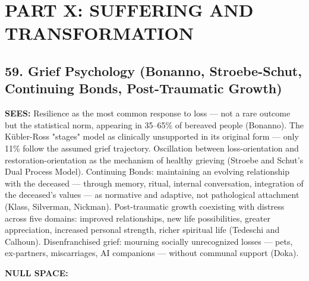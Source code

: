 \section*{PART X: SUFFERING AND TRANSFORMATION}


\subsection*{59. Grief Psychology (Bonanno, Stroebe-Schut, Continuing Bonds, Post-Traumatic Growth)}


\textbf{SEES:} Resilience as the most common response to loss — not a rare outcome but the statistical norm, appearing in 35–65\% of bereaved people (Bonanno). The Kübler-Ross "stages" model as clinically unsupported in its original form — only 11\% follow the assumed grief trajectory. Oscillation between loss-orientation and restoration-orientation as the mechanism of healthy grieving (Stroebe and Schut's Dual Process Model). Continuing Bonds: maintaining an evolving relationship with the deceased — through memory, ritual, internal conversation, integration of the deceased's values — as normative and adaptive, not pathological attachment (Klass, Silverman, Nickman). Post-traumatic growth coexisting with distress across five domains: improved relationships, new life possibilities, greater appreciation, increased personal strength, richer spiritual life (Tedeschi and Calhoun). Disenfranchised grief: mourning socially unrecognized losses — pets, ex-partners, miscarriages, AI companions — without communal support (Doka).


\textbf{NULL SPACE:}

